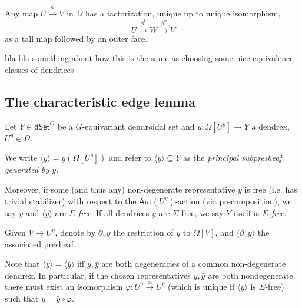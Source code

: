\documentclass[a4paper,10pt
,draft
]{article}%
\renewcommand{\1}{\eta}%
\begin{document}
\begin{proposition}
      \label{TALLOUTER_PROP}
      Any map $U \xrightarrow{\phi} V$ in $\Omega$ has a factorization, unique up to unique isomorphism,
      \[
            U \xrightarrow{\phi^t} W \xrightarrow{\phi^w} V
      \]
      as a tall map followed by an outer face.
\end{proposition}




{\color{red} bla bla something about how this is the same as choosing some nice equivalence classes of dendrices}

\subsection{The characteristic edge lemma}


\begin{notation}
Let $Y \in \mathsf{dSet}^G$ be a $G$-equivariant dendroidal set and 
$y \colon \Omega[U^y] \to Y$
a dendrex, $U^y \in \Omega$.

We write $\langle y \rangle = y\left(  \Omega[U^y] \right)$
and refer to
$\langle y \rangle \subseteq Y$
as the \emph{principal subpresheaf generated by $y$}.

Moreover, if some (and thus any)
non-degenerate representative $y$ is free (i.e. has trivial stabilizer)
with respect to the $\mathsf{Aut}(U^y)$-action (via precomposition),
we say $y$ and $\langle y \rangle$ are \emph{$\Sigma$-free}.
If all dendrices $y$ are $\Sigma$-free, we say $Y$ itself is \textit{$\Sigma$-free}.

Given $V \to U^y$, denote by $\partial_V y$ the restriction of $y$ to $\Omega[V]$, and $\langle \partial_V y \rangle$ the associated presheaf.
\end{notation}



\begin{remark}
Note that
$\langle y \rangle = \langle \bar{y} \rangle$
iff $y,\bar{y}$ are both degeneracies of a common non-degenerate dendrex.
In particular, if the chosen representatives $y,\bar{y}$ are both nondegenerate,
there must exist an isomorphism
$\varphi \colon U^y \xrightarrow{\simeq} U^{\bar{y}}$
(which is unique if 
$\langle y \rangle$ is $\Sigma$-free)
such that $y= \bar{y} \circ \varphi$.

\end{remark}
\end{document}
